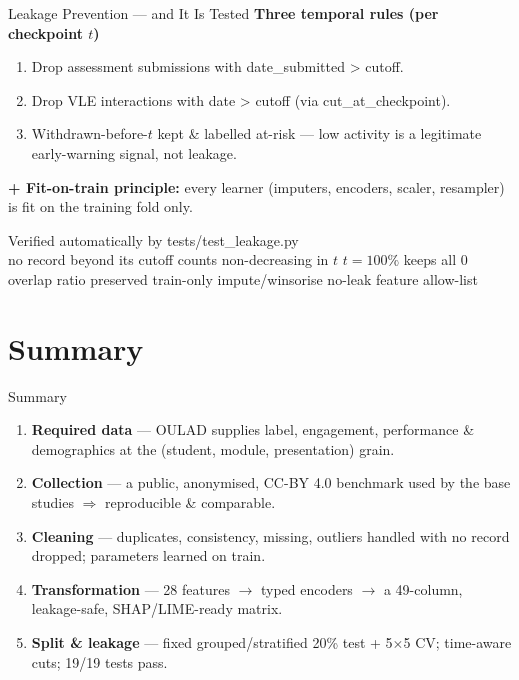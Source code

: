 \documentclass[aspectratio=169,10pt]{beamer}
\newcommand{\tcode}[1]{{\ttfamily #1}}
\begin{document}
\begin{frame}{Leakage Prevention — and It Is Tested}
  \footnotesize\textbf{Three temporal rules (per checkpoint $t$)}
  \begin{enumerate}\setlength\itemsep{0.2em}
    \item Drop assessment submissions with \tcode{date\_submitted > cutoff}.
    \item Drop VLE interactions with \tcode{date > cutoff} (via \tcode{cut\_at\_checkpoint}).
    \item Withdrawn-before-$t$ kept \& labelled at-risk — low activity is a legitimate early-warning signal, not leakage.
  \end{enumerate}
  \textbf{+ Fit-on-train principle:} every learner (imputers, encoders, scaler, resampler) is fit on the training fold only.
  \vspace{3pt}
  \begin{exampleblock}{Verified automatically by \tcode{tests/test\_leakage.py}}
    \\[2pt]
    {\scriptsize no record beyond its cutoff \textbullet{} counts non-decreasing in $t$ \textbullet{} $t{=}100\%$ keeps all \textbullet{} 0 overlap \textbullet{} ratio preserved \textbullet{} train-only impute/winsorise \textbullet{} no-leak feature allow-list}
  \end{exampleblock}
\end{frame}

\section*{Summary}
\begin{frame}{Summary}
  \footnotesize
  \begin{enumerate}\setlength\itemsep{0.5em}
    \item[\textcolor{ccnured}{\textbf{01}}] \textbf{Required data} — OULAD supplies label, engagement, performance \& demographics at the \tcode{(student, module, presentation)} grain.
    \item[\textcolor{ccnured}{\textbf{02}}] \textbf{Collection} — a public, anonymised, CC-BY 4.0 benchmark used by the base studies $\Rightarrow$ reproducible \& comparable.
    \item[\textcolor{ccnured}{\textbf{03}}] \textbf{Cleaning} — duplicates, consistency, missing, outliers handled with no record dropped; parameters learned on train.
    \item[\textcolor{ccnured}{\textbf{04}}] \textbf{Transformation} — 28 features $\to$ typed encoders $\to$ a 49-column, leakage-safe, SHAP/LIME-ready matrix.
    \item[\textcolor{ccnured}{\textbf{05}}] \textbf{Split \& leakage} — fixed grouped/stratified 20\% test + 5$\times$5 CV; time-aware cuts; 19/19 tests pass.
  \end{enumerate}
\end{frame}
\end{document}
